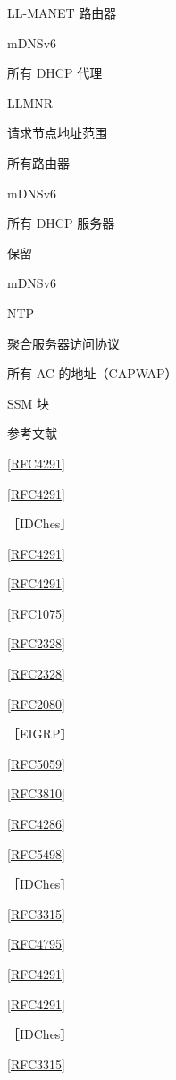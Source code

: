 LL-MANET 路由器

mDNSv6

所有 DHCP 代理

LLMNR

请求节点地址范围

所有路由器

mDNSv6

所有 DHCP 服务器

保留

mDNSv6

NTP

聚合服务器访问协议

所有 AC 的地址（CAPWAP）

SSM 块

参考文献

\href{https://www.rfc-editor.org/rfc/rfc4291}{[RFC4291]}

\href{https://www.rfc-editor.org/rfc/rfc4291}{[RFC4291]}

［IDChes］

\href{https://www.rfc-editor.org/rfc/rfc4291}{[RFC4291]}

\href{https://www.rfc-editor.org/rfc/rfc4291}{[RFC4291]}

\href{https://www.rfc-editor.org/rfc/rfc1075}{[RFC1075]}

\href{https://www.rfc-editor.org/rfc/rfc2328}{[RFC2328]}

\href{https://www.rfc-editor.org/rfc/rfc2328}{[RFC2328]}

\href{https://www.rfc-editor.org/rfc/rfc2080}{[RFC2080]}

［EIGRP］

\href{https://www.rfc-editor.org/rfc/rfc5059}{[RFC5059]}

\href{https://www.rfc-editor.org/rfc/rfc3810}{[RFC3810]}

\href{https://www.rfc-editor.org/rfc/rfc4286}{[RFC4286]}

\href{https://www.rfc-editor.org/rfc/rfc5498}{[RFC5498]}

［IDChes］

\href{https://www.rfc-editor.org/rfc/rfc3315}{[RFC3315]}

\href{https://www.rfc-editor.org/rfc/rfc4795}{[RFC4795]}

\href{https://www.rfc-editor.org/rfc/rfc4291}{[RFC4291]}

\href{https://www.rfc-editor.org/rfc/rfc4291}{[RFC4291]}

［IDChes］

\href{https://www.rfc-editor.org/rfc/rfc3315}{[RFC3315]}

